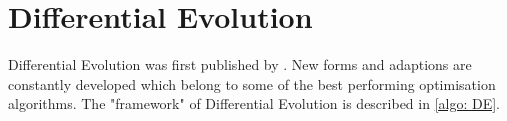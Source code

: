 \documentclass[./\jobname.tex]{subfiles}
\begin{document}
\begin{table}[H]
	\centering
	\noindent{}
	\label{tab:sphere}
\end{table}


\section{Differential Evolution}

Differential Evolution was first published by \cite{storn_differential_1997}. New forms and adaptions are constantly developed which belong to some of the best performing optimisation algorithms. The "framework" of Differential Evolution is described in \autoref{algo: DE}. 
\end{document}
